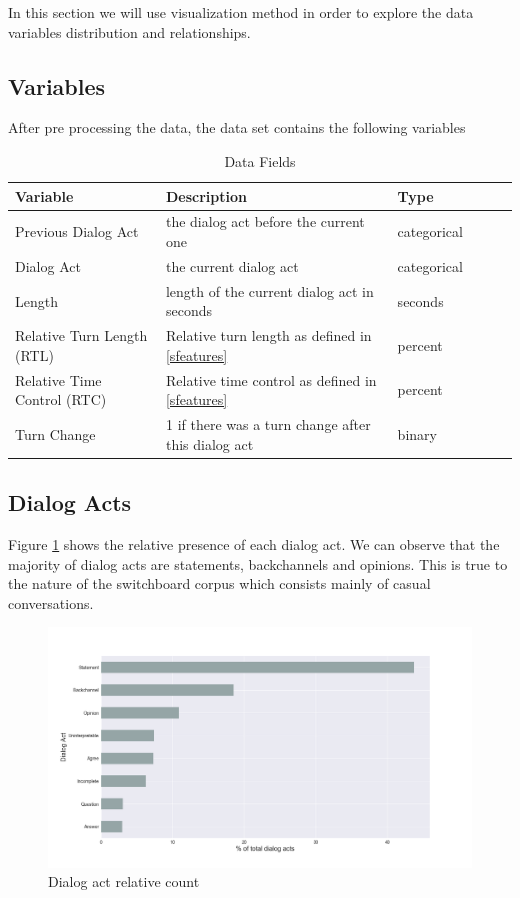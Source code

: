 In this section we will use visualization method in order to explore the data variables
distribution and relationships.

\subsection{Variables}

After pre processing the data, the data set contains the following variables

\begin{table}[ht!]
\begin{center}
\begin{tabular}{llllrr}
\toprule
Variable &  Description & Type &\\
\midrule
     Previous Dialog Act & the dialog act before the current one  & categorical\\
     Dialog Act & the current dialog act & categorical \\
     Length & length of the current dialog act in seconds & seconds \\
     Relative Turn Length (RTL)  & Relative turn length as defined in \ref{sfeatures} & percent \\
     Relative Time Control (RTC) & Relative time control as defined in \ref{sfeatures} & percent \\
     Turn Change & 1 if there was a turn change after this dialog act & binary \\
\bottomrule
\end{tabular}
\end{center}
\caption{Data Fields}
\end{table}


\subsection{Dialog Acts}

Figure \ref{f1} shows the relative presence of each dialog act. We can observe that the majority of dialog acts are statements, backchannels and opinions. This is true to the nature of the switchboard corpus
which consists mainly of casual conversations.

 \begin{figure}[ht!]
 \centering
 \includegraphics[width=\textwidth]{../scikitlearn/figures/f1.png}
 \caption{Dialog act relative count\label{overflow}}
 \label{f1}
 \end{figure}

